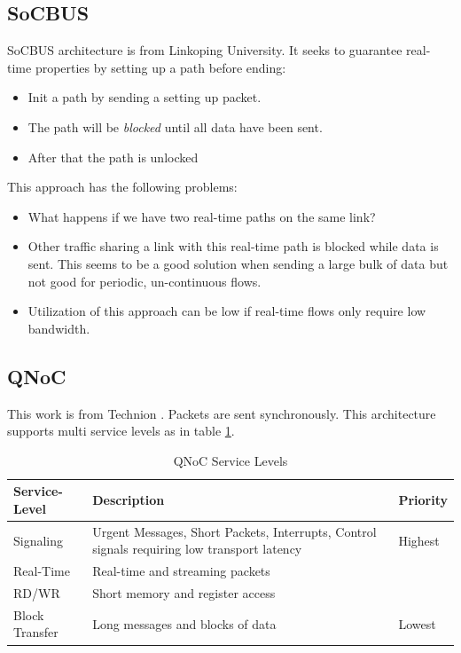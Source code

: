 \documentclass[10pt]{article}
\begin{document}
\subsection{SoCBUS}
SoCBUS architecture \cite{SoCBUS} is from Linkoping University. It seeks to 
guarantee real-time properties by setting up a path before ending:
\begin{itemize}
\item Init a path by sending a setting up packet.
\item The path will be {\em blocked} until all data have been sent.
\item After that the path is unlocked
\end{itemize}
This approach has the following problems: 
\begin{itemize}
\item What happens if we have two real-time paths on the same link?
\item Other traffic sharing a link with this real-time path is blocked while 
data is sent. This seems to be a good solution when sending a large bulk of data 
but not good for periodic, un-continuous flows.
\item Utilization of this approach can be low if real-time flows only require
low bandwidth.
\end{itemize}
\subsection{QNoC}
This work is from Technion \cite{QNoC}. Packets are sent synchronously. 
This architecture supports multi service levels as in table \ref{table:QNoCTable}.

\begin{table}[h]
\begin{center}
  \begin{tabular}{ | p{2.5cm} | p{6cm} | p{2cm} |}
    \hline
	Service-Level & Description & Priority \\ \hline
	Signaling & Urgent Messages, Short Packets, Interrupts, Control signals 
	requiring low transport latency & Highest \\ \hline
	Real-Time & Real-time and streaming packets & \\ \hline
	RD/WR & Short memory and register access & \\ \hline
	Block Transfer & Long messages and blocks of data & Lowest \\
    \hline
  \end{tabular}
\end{center}
\caption{QNoC Service Levels}
\label{table:QNoCTable}
\end{table}
\end{document}
